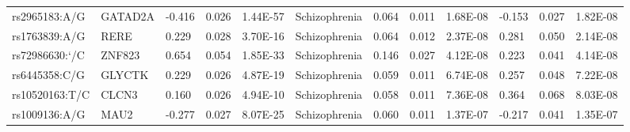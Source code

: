 \begin{table}[]
{\begin{tabular}{llllllllllll}
		\rowcolor[HTML]{BEBEBE}rs2965183:A/G                    & GATAD2A                           & -0.416                            & 0.026                           & 1.44E-57                       & Schizophrenia                              & 0.064                             & 0.011                           & 1.68E-08                       & -0.153                          & 0.027                           & 1.82E-08                       \\
	\rowcolor[HTML]{BEBEBE}	rs1763839:A/G                    & RERE                              & 0.229                             & 0.028                           & 3.70E-16                       & Schizophrenia                              & 0.064                             & 0.012                           & 2.37E-08                       & 0.281                           & 0.050                           & 2.14E-08                       \\
	\rowcolor[HTML]{BEBEBE}	rs72986630:`/C                   & ZNF823                            & 0.654                             & 0.054                           & 1.85E-33                       & Schizophrenia                              & 0.146                             & 0.027                           & 4.12E-08                       & 0.223                           & 0.041                           & 4.14E-08                       \\
		\rowcolor[HTML]{BEBEBE}rs6445358:C/G                    & GLYCTK                            & 0.229                             & 0.026                           & 4.87E-19                       & Schizophrenia                              & 0.059                             & 0.011                           & 6.74E-08                       & 0.257                           & 0.048                           & 7.22E-08                       \\
		\rowcolor[HTML]{BEBEBE}rs10520163:T/C                   & CLCN3                             & 0.160                             & 0.026                           & 4.94E-10                       & Schizophrenia                              & 0.058                             & 0.011                           & 7.36E-08                       & 0.364                           & 0.068                           & 8.03E-08                       \\
		\rowcolor[HTML]{BEBEBE}rs1009136:A/G                    & MAU2                              & -0.277                            & 0.027                           & 8.07E-25                       & Schizophrenia                              & 0.060                             & 0.011                           & 1.37E-07                       & -0.217                          & 0.041                           & 1.35E-07                      
	\end{tabular}}
\end{table}

